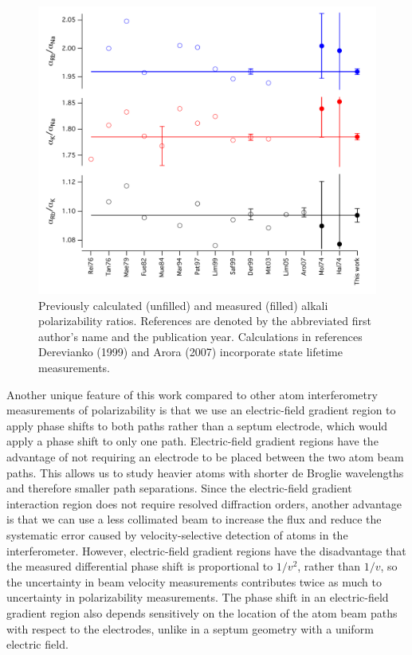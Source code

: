 \begin{figure}
\includegraphics[width=1\textwidth]{Figures/PolPRAratios.pdf}
\caption[Previously calculated and measured alkali polarizability ratios.]{\label{polPreviousWorkPlot} Previously calculated (unfilled) and measured (filled) alkali polarizability ratios. References are denoted by the abbreviated first author's name and the publication year. Calculations in references Derevianko \etal (1999) \cite{Der99} and Arora \etal (2007) \cite{Aro07} incorporate state lifetime measurements.}
\end{figure}



Another unique feature of this work compared to other atom interferometry measurements of polarizability \cite{Eks95,Mif06} is that we use an electric-field gradient region to apply phase shifts to both paths rather than a septum electrode, which would apply a phase shift to only one path. Electric-field gradient regions have the advantage of not requiring an electrode to be placed between the two atom beam paths. This allows us to study heavier atoms with shorter de Broglie wavelengths and therefore smaller path separations. Since the electric-field gradient interaction region does not require resolved diffraction orders, another advantage is that we can use a less collimated beam to increase the flux and reduce the systematic error caused by velocity-selective detection of atoms in the interferometer. However, electric-field gradient regions have the disadvantage that the measured differential phase shift is proportional to $1/v^2$, rather than $1/v$, so the uncertainty in beam velocity measurements contributes twice as much to uncertainty in polarizability measurements. The phase shift in an electric-field gradient region also depends sensitively on the location of the atom beam paths with respect to the electrodes, unlike in a septum geometry with a uniform electric field. 


